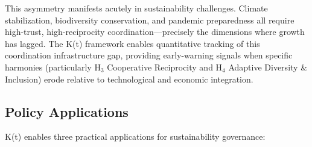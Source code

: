 \documentclass[11pt,letterpaper]{article}
\begin{document}
This asymmetry manifests acutely in sustainability challenges. Climate stabilization, biodiversity conservation, and pandemic preparedness all require high-trust, high-reciprocity coordination---precisely the dimensions where growth has lagged. The K(t) framework enables quantitative tracking of this coordination infrastructure gap, providing early-warning signals when specific harmonies (particularly H$_3$ Cooperative Reciprocity and H$_4$ Adaptive Diversity \& Inclusion) erode relative to technological and economic integration.

\subsection{Policy Applications}

K(t) enables three practical applications for sustainability governance:
\end{document}
